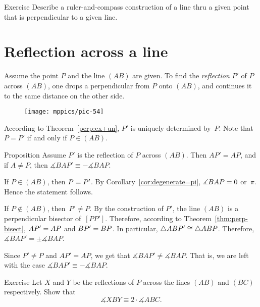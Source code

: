 \begin{thm}{Exercise}\label{ex:construction-perpendicular}
Describe a ruler-and-compass construction of a line thru a given point that is perpendicular to a given line.
\end{thm}

\section{Reflection across a line}

Assume the point $P$ and the line $(AB)$ are given.
To find the \emph{reflection} $P'$ of $P$ across $(AB)$,
one drops a perpendicular from $P$ onto $(AB)$, 
and continues it to the same distance on the other side.

{

\begin{wrapfigure}{o}{37mm}
\vskip-2mm
\centering
\texttt{[image: mppics/pic-54]}
\end{wrapfigure}

According to Theorem~\ref{perp:ex+un}, $P'$ is uniquely determined by~$P$.
Note that $P=P'$ if and only if $P\in(AB)$.

\begin{thm}[\abs]{Proposition}\label{prop:reflection}
Assume $P'$ is the reflection of $P$ across $(AB)$.
Then $AP'=AP$, 
and if $A\ne P$, 
then
$\measuredangle BAP'\equiv -\measuredangle BAP$.
\end{thm}


If $P\in (AB)$, 
then $P=P'$. 
By Corollary~\ref{cor:degenerate=pi}, $\measuredangle BAP=0$ or~$\pi$.
Hence the statement follows.

}

If $P\notin (AB)$, then~$P'\ne P$.
By the construction of $P'$, 
the line $(AB)$ is a perpendicular bisector of~$[PP']$.
Therefore, according to Theorem~\ref{thm:perp-bisect}, $AP'=AP$ and $BP'=BP$.
In particular, 
$\triangle ABP'\cong \triangle ABP$.
Therefore, $\measuredangle BAP'=\pm \measuredangle BAP$.

Since $P'\ne P$ and $AP'=AP$,
we get that $\measuredangle BAP'\ne \measuredangle BAP$.
That is, we are left with the case $\measuredangle BAP'\equiv-\measuredangle BAP$.
\qeds



\begin{thm}{Exercise}\label{ex:2-reflections}
Let $X$ and $Y$ be the reflections of $P$ across the lines $(AB)$ and $(BC)$ respectively.
Show that 
$$\measuredangle XBY\equiv 2\cdot \measuredangle ABC.$$

\end{thm}


